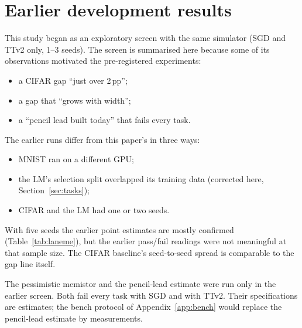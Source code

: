 \section{Earlier development results}\label{app:laneme}
This study began as an exploratory screen with the same simulator (SGD and TTv2 only, 1--3 seeds). The screen is summarised
here because some of its observations motivated the pre-registered experiments:
\begin{itemize}
\item a CIFAR gap ``just over 2\,pp'';
\item a gap that ``grows with width'';
\item a ``pencil lead built today'' that fails every task.
\end{itemize}

The earlier runs differ from this paper's in three ways:
\begin{itemize}
\item MNIST ran on a different GPU;
\item the LM's selection split overlapped its training data (corrected here, Section~\ref{sec:tasks});
\item CIFAR and the LM had one or two seeds.
\end{itemize}

With five seeds the earlier point estimates are mostly confirmed (Table~\ref{tab:laneme}), but the earlier pass/fail readings
were not meaningful at that sample size. The CIFAR baseline's seed-to-seed spread is comparable to the gap line itself.

The pessimistic memistor and the pencil-lead estimate were run only in the earlier screen. Both fail every task with SGD and with
TTv2. Their specifications are estimates; the bench protocol of Appendix~\ref{app:bench} would replace the pencil-lead estimate
by measurements.


